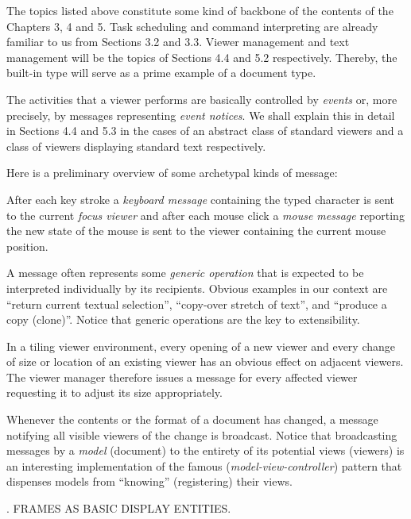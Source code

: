 The topics listed above constitute some kind of backbone of the
contents of the Chapters 3, 4 and 5. Task scheduling and command
interpreting are already familiar to us from Sections 3.2 and
3.3. Viewer management and text management will be the topics of
Sections 4.4 and 5.2 respectively. Thereby, the built-in type 
will serve as a prime example of a document type.

The activities that a viewer performs are basically controlled by
\emph{events} or, more precisely, by messages representing \emph{event notices}. We
shall explain this in detail in Sections 4.4 and 5.3 in the cases of
an abstract class of standard viewers and a class of viewers
displaying standard text respectively.

Here is a preliminary overview of some archetypal kinds of message:

\item\bullet After each key stroke a \emph{keyboard message} containing the typed character is sent to the current \emph{focus viewer} and after each mouse click a \emph{mouse message} reporting the new state of the mouse is sent to the viewer containing the current mouse position.

\item\bullet A message often represents some \emph{generic operation} that is expected to be interpreted individually by its recipients. Obvious examples in our context are ``return current textual selection'', ``copy-over stretch of text'', and ``produce a copy (clone)''. Notice that generic operations are the key to extensibility.

\item\bullet In a tiling viewer environment, every opening of a new viewer and every change of size or location of an existing viewer has an obvious effect on adjacent viewers. The viewer manager therefore issues a message for every affected viewer requesting it to adjust its size appropriately.

\item\bullet Whenever the contents or the format of a document has changed, a message notifying all visible viewers of the change is broadcast. Notice that broadcasting messages by a \emph{model} (document) to the entirety of its potential views (viewers) is an interesting implementation of the famous  (\emph{model-view-controller}) pattern that dispenses models from ``knowing'' (registering) their views.

. FRAMES AS BASIC DISPLAY ENTITIES.


